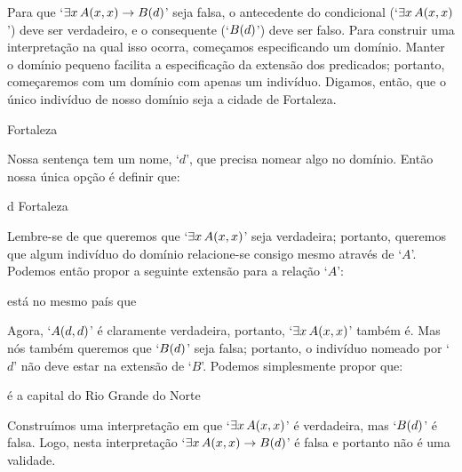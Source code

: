 Para que `$\exists x\,\mathord{A}(x,x) \rightarrow \mathord{B}(d)$' seja falsa, o antecedente do condicional (`$\exists x\, \mathord{A}(x,x)$') deve ser verdadeiro, e o consequente (`$\mathord{B}(d)$') deve ser falso.
Para construir uma interpretação na qual isso ocorra, começamos especificando um domínio.
Manter o domínio pequeno facilita a especificação da extensão dos predicados; portanto, começaremos com um domínio com apenas um indivíduo.
Digamos, então, que o único indivíduo de nosso domínio seja a cidade de Fortaleza.
\begin{center}
	\begin{ekey}
		\item[\text{domínio}] Fortaleza
	\end{ekey}
\end{center}
Nossa sentença tem um nome, `$d$', que precisa nomear algo no domínio.
Então nossa única opção é definir que:
\begin{center}
	\begin{ekey}
		\item[d] Fortaleza
	\end{ekey}
\end{center}
Lembre-se de que queremos que `$\exists x\, \mathord{A}(x,x)$' seja verdadeira; portanto, queremos que algum indivíduo do domínio relacione-se consigo mesmo através de `$A$'.
Podemos então propor a seguinte extensão para a relação `$A$':
\begin{center}
	\begin{ekey}
		\item[\atom{A}{x,y}]  está no mesmo país que 
	\end{ekey}
\end{center}
Agora, `$\mathord{A}(d,d)$' é claramente verdadeira, portanto, `$\exists x\, \mathord{A}(x,x)$' também é. 
Mas nós também queremos que `$\mathord{B}(d)$' seja falsa; portanto, o indivíduo nomeado por `$d$' não deve estar na extensão de `$B$'.
Podemos simplesmente propor que:
\begin{center}
	\begin{ekey}
		\item[\atom{B}{x}]  é a capital do Rio Grande do Norte
	\end{ekey}
\end{center}
Construímos uma interpretação em que `$\exists x\, \mathord{A}(x,x)$' é verdadeira, mas `$\mathord{B}(d)$' é falsa.
Logo, nesta interpretação `$\exists x\, \mathord{A}(x,x) \rightarrow \mathord{B}(d)$' é falsa e portanto não é uma validade.


